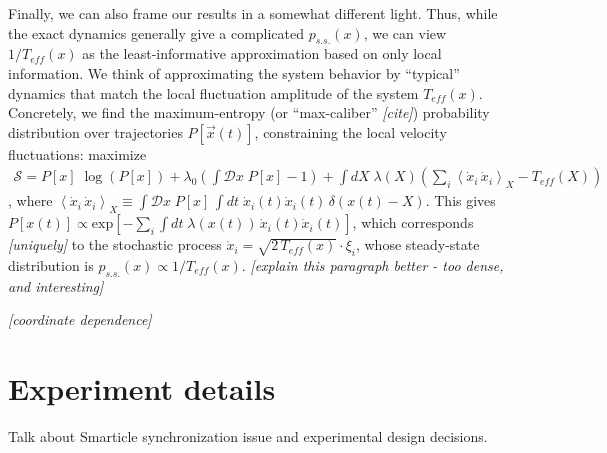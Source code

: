 \documentclass[reprint,prx]{revtex4-1}
\renewcommand{\v}[1]{\ensuremath{\vec{#1}}} %
\renewcommand{\=}[1]{\stackrel{#1}{=}} %
\renewcommand{\(}{\left (}
\renewcommand{\)}{\right  )}
\renewcommand{\[}{\left [}
\renewcommand{\]}{\right ]}
\newcommand{\<}{\left <}
\renewcommand{\>}{\right >}
\theoremstyle{definition}
\theoremstyle{remark}
\renewcommand{\exp}[1]{\mbox{exp}\[#1\]} %
\renewcommand{\todo}[1]{\textit{\color{red}[#1]}}
\begin{document}
Finally, we can also frame our results in a somewhat different light. 
Thus, while the exact dynamics generally give a complicated $ p_{s.s.}(x) $, we can view $1/T_{eff}(x) $ as the least-informative approximation based on only local information.
We think of approximating the system behavior by ``typical'' dynamics that match the local fluctuation amplitude of the system $ T_{eff}(x) $. Concretely, we find the maximum-entropy (or ``max-caliber'' \todo{cite}) probability distribution over trajectories $ P[\v{x}(t)] $, constraining the local velocity fluctuations: maximize 
\begin{align*}
\mathcal{S} = P[x] \;\log\(P[x]\) + \lambda_0 \( \int \mathcal{D} x \;P[x] - 1\) + \int dX \; \lambda(X) \(\sum _i \< \dot{x}_i\,\dot{x}_i\> _X - T_{eff}(X)\)
\end{align*}, where $ \< \dot{x}_i\, \dot{x}_i\> _X \equiv \int \mathcal{D}x \; P[x] \,\int dt \; \dot{x}_i(t) \dot{x}_i(t) \,\delta(x(t) - X) $. This gives $ P[x(t)] \propto \exp{-\sum_i \int dt \; \lambda(x(t))\,\dot{x}_i(t)\dot{x}_i(t)} $, which corresponds \todo{uniquely} to the stochastic process $ \dot{x}_i = \sqrt{2\,T_{eff}(x)}\cdot \xi_i$, whose steady-state distribution is $ p_{s.s.}(x)\propto 1/T_{eff}(x) $. \todo{explain this paragraph better - too dense, and interesting}


\todo{coordinate dependence}









\appendix
\renewcommand{\thesection}{\Alph{section}} 
\section{Experiment details}
Talk about Smarticle synchronization issue and experimental design decisions.
\end{document}
